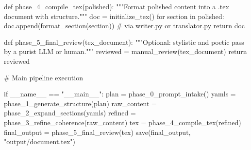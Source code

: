 \documentclass[12pt,a4paper]{article}
\begin{document}
\begin{metaoutput}
def phase_4_compile_tex(polished):
    """Format polished content into a .tex document with structure."""
    doc = initialize_tex()
    for section in polished:
        doc.append(format_section(section))  # via writer.py or translator.py
    return doc

def phase_5_final_review(tex_document):
    """Optional: stylistic and poetic pass by a purist LLM or human."""
    reviewed = manual_review(tex_document)
    return reviewed

# Main pipeline execution

if __name__ == "__main__":
    plan = phase_0_prompt_intake()
    yamls = phase_1_generate_structure(plan)
    raw_content = phase_2_expand_sections(yamls)
    refined = phase_3_refine_coherence(raw_content)
    tex = phase_4_compile_tex(refined)
    final_output = phase_5_final_review(tex)
    save(final_output, "output/document.tex")
				
			\end{metaoutput}
			
		
\end{document}

